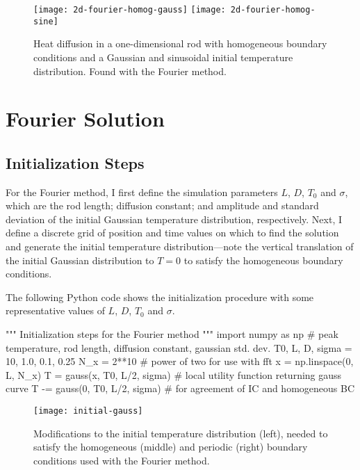\documentclass[11pt, a4paper]{article}
\begin{document}
\begin{figure}[htb!]
\centering
\texttt{[image: 2d-fourier-homog-gauss]} \hfill
\texttt{[image: 2d-fourier-homog-sine]}
\caption{Heat diffusion in a one-dimensional rod with homogeneous boundary conditions and a Gaussian and sinusoidal initial temperature distribution. Found with the Fourier method.}
\label{spec:fig:2d-fourier-homog}
\end{figure}

\section{Fourier Solution}  \label{spec:s:solution}


\subsection{Initialization Steps}
For the Fourier method, I first define the simulation parameters $ L $, $ D $, $ T_{0} $ and $ \sigma $, which are the rod length; diffusion constant; and amplitude and standard deviation of the initial Gaussian temperature distribution, respectively. Next, I define a discrete grid of position and time values on which to find the solution and generate the initial temperature distribution---note the vertical translation of the initial Gaussian distribution to $ T = 0 $ to satisfy the homogeneous boundary conditions.

The following Python code shows the initialization procedure with some representative values of $ L $, $ D $, $ T_{0} $ and $ \sigma $.
\begin{python}
""" Initialization steps for the Fourier method """
import numpy as np
# peak temperature, rod length, diffusion constant, gaussian std. dev.
T0, L, D, sigma = 10, 1.0, 0.1, 0.25
N_x = 2**10  # power of two for use with fft
x = np.linspace(0, L, N_x)
T = gauss(x, T0, L/2, sigma)   # local utility function returning gauss curve
T -= gauss(0, T0, L/2, sigma)  # for agreement of IC and homogeneous BC
\end{python}

\begin{figure}
\centering
\texttt{[image: initial-gauss]}
\caption{Modifications to the initial temperature distribution (left), needed to satisfy the homogeneous (middle) and periodic (right) boundary conditions used with the Fourier method.}
\label{spec:fig:initial}
\end{figure}
\end{document}
